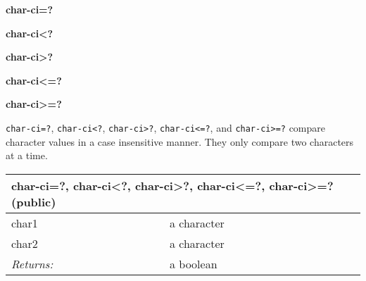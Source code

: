 \documentclass{report}
\begin{document}
\textbf{char-ci=?}


\textbf{char-ci<?}


\textbf{char-ci>?}


\textbf{char-ci<=?}


\textbf{char-ci>=?}


\texttt{char-ci=?}, \texttt{char-ci<?}, \texttt{char-ci>?}, \texttt{char-ci<=?}, and \texttt{char-ci>=?} compare character values in a case insensitive manner. They only compare two characters at a time.

\begin{tabular}{ |l l| }
\hline
\multicolumn{2}{|l|}{char-ci=?, char-ci<?, char-ci>?, char-ci<=?, char-ci>=? (public)} \\
\hline
char1 & a character \\
char2 & a character \\
\textit{Returns:} & a boolean \\
\hline
\end{tabular}
\end{document}
